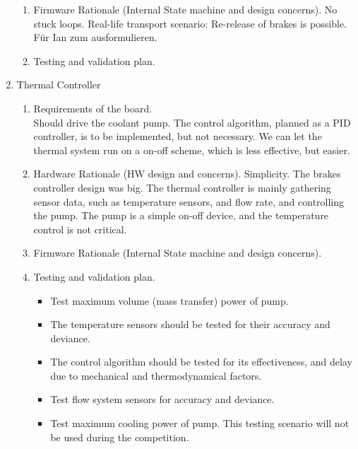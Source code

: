 \begin{enumerate}
\begin{enumerate}
        \item Firmware Rationale (Internal State machine and design concerns).
        No stuck loops. Real-life transport scenario: Re-release of brakes is possible. 
        Für Ian zum ausformulieren.

        \item Testing and validation plan.


    \end{enumerate}

    \item Thermal Controller
        \begin{enumerate}
            \item Requirements of the board.\\
            Should drive the coolant pump. The control algorithm, planned as a PID controller, is to be implemented, but not necessary. We can let the thermal system run on a on-off scheme, which is less effective, but easier.

            \item Hardware Rationale (HW design and concerns).
            Simplicity. The brakes controller design was big. The thermal controller is mainly gathering sensor data, such as temperature sensors, and flow rate, and controlling the pump. The pump is a simple on-off device, and the temperature control is not critical. 
            \item Firmware Rationale (Internal State machine and design concerns).
            \item Testing and validation plan.
            \begin{itemize}
                \item Test maximum volume (mass transfer) power of pump.
                \item The temperature sensors should be tested for their accuracy and deviance.
                \item The control algorithm should be tested for its effectiveness, and delay due to mechanical and thermodynamical factors.
                \item Test flow system sensors for accuracy and deviance.
                \item Test maximum cooling power of pump. This testing scenario will not be used during the competition.
            \end{itemize}
        \end{enumerate}


\end{enumerate}
